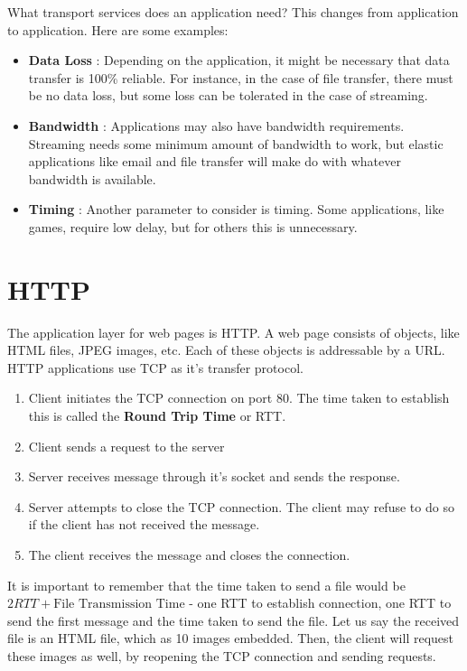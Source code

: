 \documentclass[12pt,letterpaper]{amsbook}
\theoremstyle{definition}
\begin{document}
What transport services does an application need? This changes from application to application. Here are some examples:

\begin{itemize}
  \item \textbf{Data Loss} : Depending on the application, it might be necessary that data transfer is 100\% reliable. For instance, in the case of file transfer, there must be no data loss, but some loss can be tolerated in the case of streaming.
  \item \textbf{Bandwidth} : Applications may also have bandwidth requirements. Streaming needs some minimum amount of bandwidth to work, but elastic applications like email and file transfer will make do with whatever bandwidth is available.
  \item \textbf{Timing} : Another parameter to consider is timing. Some applications, like games, require low delay, but for others this is unnecessary.
\end{itemize}

\section{HTTP}

The application layer for web pages is HTTP. A web page consists of objects, like HTML files, JPEG images, etc. Each of these objects is addressable by a URL. HTTP applications use TCP as it's transfer protocol. 

\begin{enumerate}
  \item Client initiates the TCP connection on port 80. The time taken to establish this is called the \textbf{Round Trip Time} or RTT. 
  \item Client sends a request to the server
  \item Server receives message through it's socket and sends the response.
  \item Server attempts to close the TCP connection. The client may refuse to do so if the client has not received the message.
  \item The client receives the message and closes the connection.
\end{enumerate}

It is important to remember that the time taken to send a file would be $2RTT + \text{File Transmission Time}$ - one RTT to establish connection, one RTT to send the first message and the time taken to send the file. Let us say the received file is an HTML file, which as 10 images embedded. Then, the client will request these images as well, by reopening the TCP connection and sending requests.
\end{document}
